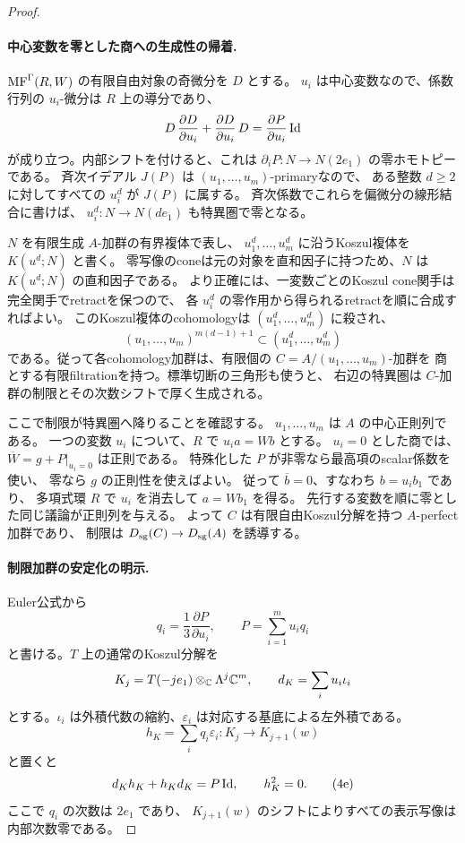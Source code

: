 \begin{proof}
 \paragraph{中心変数を零とした商への生成性の帰着.}
 \(\operatorname{MF}^\Gamma(R,W)\) の有限自由対象の奇微分を \(D\) とする。
 \(u_i\) は中心変数なので、係数行列の \(u_i\)-微分は \(R\) 上の導分であり、
 \[
 D\,\frac{\partial D}{\partial u_i}
 +\frac{\partial D}{\partial u_i}\,D
 =\frac{\partial P}{\partial u_i}\operatorname{Id}
 \]
 が成り立つ。内部シフトを付けると、これは
 \(\partial_iP:N\to N(2e_1)\) の零ホモトピーである。
 斉次イデアル \(J(P)\) は \((u_1,\ldots,u_m)\)-primaryなので、
 ある整数 \(d\ge2\) に対してすべての \(u_i^d\) が \(J(P)\) に属する。
 斉次係数でこれらを偏微分の線形結合に書けば、
 \(u_i^d:N\to N(de_1)\) も特異圏で零となる。

 \(N\) を有限生成 \(A\)-加群の有界複体で表し、
 \(u_1^d,\ldots,u_m^d\) に沿うKoszul複体を \(K(u^d;N)\) と書く。
 零写像のconeは元の対象を直和因子に持つため、\(N\) は
 \(K(u^d;N)\) の直和因子である。
 より正確には、一変数ごとのKoszul cone関手は完全関手でretractを保つので、
 各 \(u_i^d\) の零作用から得られるretractを順に合成すればよい。
 このKoszul複体のcohomologyは \((u_1^d,\ldots,u_m^d)\) に殺され、
 \[
 (u_1,\ldots,u_m)^{m(d-1)+1}\subset(u_1^d,\ldots,u_m^d)
 \]
 である。従って各cohomology加群は、有限個の \(C=A/(u_1,\ldots,u_m)\)-加群を
 商とする有限filtrationを持つ。標準切断の三角形も使うと、
 右辺の特異圏は \(C\)-加群の制限とその次数シフトで厚く生成される。

 ここで制限が特異圏へ降りることを確認する。
 \(u_1,\ldots,u_m\) は \(A\) の中心正則列である。
 一つの変数 \(u_i\) について、\(R\) で \(u_i a=Wb\) とする。
 \(u_i=0\) とした商では、\(\overline W=g+P|_{u_i=0}\) は正則である。
 特殊化した \(P\) が非零なら最高項のscalar係数を使い、
 零なら \(g\) の正則性を使えばよい。
 従って \(\overline b=0\)、すなわち \(b=u_i b_1\) であり、
 多項式環 \(R\) で \(u_i\) を消去して \(a=Wb_1\) を得る。
 先行する変数を順に零とした同じ議論が正則列を与える。
 よって \(C\) は有限自由Koszul分解を持つ \(A\)-perfect加群であり、
 制限は \(D_{\mathrm{sg}}(C)\to D_{\mathrm{sg}}(A)\) を誘導する。

 \paragraph{制限加群の安定化の明示.}
 Euler公式から
 \[
 q_i=\frac13\frac{\partial P}{\partial u_i},\qquad
 P=\sum_{i=1}^{m}u_iq_i
 \]
 と書ける。\(T\) 上の通常のKoszul分解を
 \[
 K_j=T(-je_1)\otimes_\mathbb C\Lambda^j\mathbb C^m,
 \qquad d_K=\sum_i u_i\iota_i
 \]
 とする。\(\iota_i\) は外積代数の縮約、\(\varepsilon_i\) は対応する基底による左外積である。
 \[
 h_K=\sum_iq_i\varepsilon_i:K_j\longrightarrow K_{j+1}(w)
 \]
 と置くと
 \[
 d_Kh_K+h_Kd_K=P\operatorname{Id},\qquad h_K^2=0.                         \tag{4e}\label{eq:central-koszul}
 \]
 ここで \(q_i\) の次数は \(2e_1\) であり、
 \(K_{j+1}(w)\) のシフトによりすべての表示写像は内部次数零である。


\end{proof}
